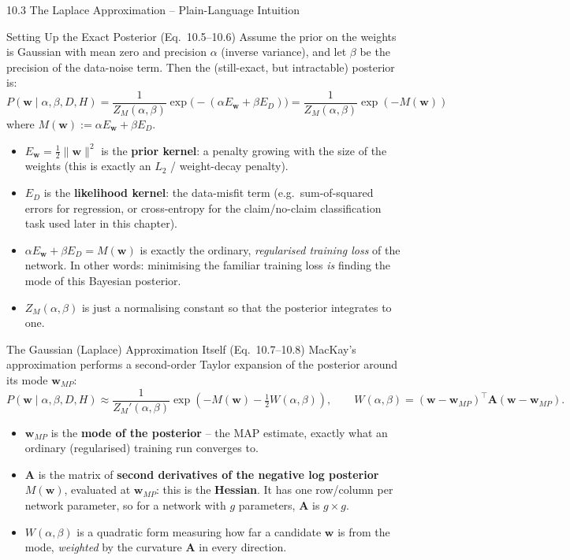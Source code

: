 \documentclass[aspectratio=169,10pt]{beamer}
\newcommand{\bw}{\mathbf{w}}
\begin{document}
\begin{frame}[allowframebreaks]{10.3 The Laplace Approximation -- Plain-Language Intuition}
  \begin{block}{Setting Up the Exact Posterior (Eq.\ 10.5--10.6)}
    Assume the prior on the weights is Gaussian with mean zero and precision
    $\alpha$ (inverse variance), and let $\beta$ be the precision of the
    data-noise term. Then the (still-exact, but intractable) posterior is:
    \[
      P(\bw \mid \alpha, \beta, D, H) = \frac{1}{Z_M(\alpha,\beta)}
        \exp\big(-(\alpha E_{\bw} + \beta E_D)\big)
      = \frac{1}{Z_M(\alpha,\beta)} \exp(-M(\bw))
    \]
    where $M(\bw) := \alpha E_{\bw} + \beta E_D$.
    \begin{itemize}
      \item $E_{\bw} = \tfrac{1}{2}\lVert \bw \rVert^2$ is the \textbf{prior
        kernel}: a penalty growing with the size of the weights (this is
        exactly an $L_2$ / weight-decay penalty).
      \item $E_D$ is the \textbf{likelihood kernel}: the data-misfit term
        (e.g.\ sum-of-squared errors for regression, or cross-entropy for
        the claim/no-claim classification task used later in this chapter).
      \item $\alpha E_{\bw} + \beta E_D = M(\bw)$ is exactly the ordinary,
        \emph{regularised training loss} of the network. In other words:
        minimising the familiar training loss \emph{is} finding the mode of
        this Bayesian posterior.
      \item $Z_M(\alpha,\beta)$ is just a normalising constant so that the
        posterior integrates to one.
    \end{itemize}
  \end{block}

  \framebreak

  \begin{block}{The Gaussian (Laplace) Approximation Itself (Eq.\ 10.7--10.8)}
    MacKay's approximation performs a second-order Taylor expansion of the
    posterior around its mode $\bw_{MP}$:
    \[
      P(\bw \mid \alpha,\beta,D,H) \approx \frac{1}{Z_M'(\alpha,\beta)}
        \exp\left(-M(\bw) - \tfrac{1}{2} W(\alpha,\beta)\right),
      \qquad
      W(\alpha,\beta) = (\bw - \bw_{MP})^\top \mathbf{A} (\bw - \bw_{MP}).
    \]
    \begin{itemize}
      \item $\bw_{MP}$ is the \textbf{mode of the posterior} -- the MAP
        estimate, exactly what an ordinary (regularised) training run
        converges to.
      \item $\mathbf{A}$ is the matrix of \textbf{second derivatives of the
        negative log posterior} $M(\bw)$, evaluated at $\bw_{MP}$: this is
        the \textbf{Hessian}. It has one row/column per network parameter,
        so for a network with $g$ parameters, $\mathbf{A}$ is $g \times g$.
      \item $W(\alpha,\beta)$ is a quadratic form measuring how far a
        candidate $\bw$ is from the mode, \emph{weighted} by the curvature
        $\mathbf{A}$ in every direction.
    \end{itemize}
  \end{block}


\end{frame}
\end{document}
